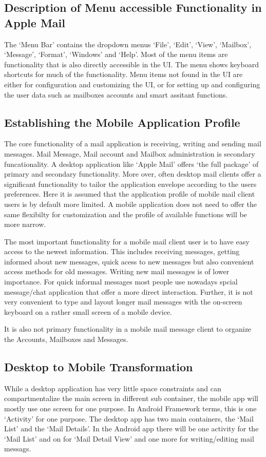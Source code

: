 \documentclass[a4paper,11pt,twoside]{article}
\begin{document}
\subsection{Description of Menu accessible Functionality in Apple Mail}
The `Menu Bar' contains the dropdown menus `File', `Edit', `View', `Mailbox',
`Message', `Format', `Windows' and `Help'. Most of the menu items are functionality
that is also directly accessible in the UI. The menu shows keyboard shortcuts for
much of the functionality. Menu items not found in the UI are either for
configuration and customizing the UI, or for setting up and configuring the user
data such as mailboxes accounts and smart assitant functions.


\subsection{Establishing the Mobile Application Profile}
The core functionality of a mail application is receiving, writing and sending
mail messages. Mail Message, Mail account and Mailbox administration is
secondary funcationality. A desktop application like `Apple Mail' offers `the
full package' of primary and secondary functionality. More over, often desktop
mail clients offer a significant functionality to tailor the application
envelope according to the users preferences. Here it is assumed that the
application profile of mobile mail client users is by default more limited. A
mobile application does not need to offer the same flexibilty for customization
and the profile of available functions will be more narrow.

The most important functionality for a mobile mail client user is to have easy
access to the newest information. This includes receiving messages, getting
informed about new messages, quick acess to new messages but also convenient
access methods for old messages. Writing new mail messages is of lower
importance. For quick informal messages most people use nowadays spcial
message/chat application that offer a more direct interaction. Further, it is
not very convenient to type and layout longer mail messages with the on-screen
keyboard on a rather small screen of a mobile device.

It is also not primary functionality in a mobile mail message client to organize
the Accounts, Mailboxes and Messages.

\subsection{Desktop to Mobile Transformation}
While a desktop application has very little space constraints and can
compartmentalize the main screen in different sub container, the mobile app will
mostly use one screen for one purpose. In Android Framework terms, this is
one `Activity' for one purpose. The desktop app has two main containers, the
`Mail List' and the `Mail Details'. In the Android app there will be one
activity for the `Mail List' and on for `Mail Detail View' and one
more for writing/editing mail messags.
\end{document}
